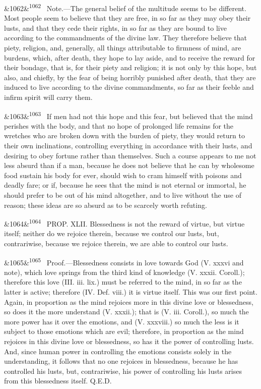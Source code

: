 \documentclass[12pt]{article}
\newcommand{\para}[1][]{\par\noindent\ifx&#1&\else\textsuperscript{\footnotesize #1}~\fi}
\begin{document}
\para[1062] Note.---The general belief of the multitude seems to be different. Most people seem to believe that they are free, in so far as they may obey their lusts, and that they cede their rights, in so far as they are bound to live according to the commandments of the divine law. They therefore believe that piety, religion, and, generally, all things attributable to firmness of mind, are burdens, which, after death, they hope to lay aside, and to receive the reward for their bondage, that is, for their piety and religion; it is not only by this hope, but also, and chiefly, by the fear of being horribly punished after death, that they are induced to live according to the divine commandments, so far as their feeble and infirm spirit will carry them.

\para[1063] If men had not this hope and this fear, but believed that the mind perishes with the body, and that no hope of prolonged life remains for the wretches who are broken down with the burden of piety, they would return to their own inclinations, controlling everything in accordance with their lusts, and desiring to obey fortune rather than themselves. Such a course appears to me not less absurd than if a man, because he does not believe that he can by wholesome food sustain his body for ever, should wish to cram himself with poisons and deadly fare; or if, because he sees that the mind is not eternal or immortal, he should prefer to be out of his mind altogether, and to live without the use of reason; these ideas are so absurd as to be scarcely worth refuting.

\para[1064] PROP. XLII. Blessedness is not the reward of virtue, but virtue itself; neither do we rejoice therein, because we control our lusts, but, contrariwise, because we rejoice therein, we are able to control our lusts.

\para[1065] Proof.---Blessedness consists in love towards God (V. xxxvi and note), which love springs from the third kind of knowledge (V. xxxii. Coroll.); therefore this love (III. iii. lix.) must be referred to the mind, in so far as the latter is active; therefore (IV. Def. viii.) it is virtue itself. This was our first point. Again, in proportion as the mind rejoices more in this divine love or blessedness, so does it the more understand (V. xxxii.); that is (V. iii. Coroll.), so much the more power has it over the emotions, and (V. xxxviii.) so much the less is it subject to those emotions which are evil; therefore, in proportion as the mind rejoices in this divine love or blessedness, so has it the power of controlling lusts. And, since human power in controlling the emotions consists solely in the understanding, it follows that no one rejoices in blessedness, because he has controlled his lusts, but, contrariwise, his power of controlling his lusts arises from this blessedness itself. Q.E.D.
\end{document}
